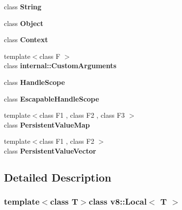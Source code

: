 \begin{DoxyCompactItemize}
\item 
\hypertarget{classv8_1_1Local_a7fb804f7dc96dd9f705c84095f37f1ca}{}class {\bfseries String}\label{classv8_1_1Local_a7fb804f7dc96dd9f705c84095f37f1ca}

\item 
\hypertarget{classv8_1_1Local_a0720b5f434e636e22a3ed34f847eec57}{}class {\bfseries Object}\label{classv8_1_1Local_a0720b5f434e636e22a3ed34f847eec57}

\item 
\hypertarget{classv8_1_1Local_ac26c806e60ca4a0547680edb68f6e39b}{}class {\bfseries Context}\label{classv8_1_1Local_ac26c806e60ca4a0547680edb68f6e39b}

\item 
\hypertarget{classv8_1_1Local_a07108678a2af25caab612879ed7dca62}{}{\footnotesize template$<$class F $>$ }\\class {\bfseries internal\+::\+Custom\+Arguments}\label{classv8_1_1Local_a07108678a2af25caab612879ed7dca62}

\item 
\hypertarget{classv8_1_1Local_a5f127e488db492b05c8542cec0b880b7}{}class {\bfseries Handle\+Scope}\label{classv8_1_1Local_a5f127e488db492b05c8542cec0b880b7}

\item 
\hypertarget{classv8_1_1Local_ade20a528f8ee42d426959f061cff29ff}{}class {\bfseries Escapable\+Handle\+Scope}\label{classv8_1_1Local_ade20a528f8ee42d426959f061cff29ff}

\item 
\hypertarget{classv8_1_1Local_a401e5cd2db49a67497042617f01fdbc2}{}{\footnotesize template$<$class F1 , class F2 , class F3 $>$ }\\class {\bfseries Persistent\+Value\+Map}\label{classv8_1_1Local_a401e5cd2db49a67497042617f01fdbc2}

\item 
\hypertarget{classv8_1_1Local_a978bb1377559897d74d5fe883a54a315}{}{\footnotesize template$<$class F1 , class F2 $>$ }\\class {\bfseries Persistent\+Value\+Vector}\label{classv8_1_1Local_a978bb1377559897d74d5fe883a54a315}

\end{DoxyCompactItemize}


\subsection{Detailed Description}
\subsubsection*{template$<$class T$>$class v8\+::\+Local$<$ T $>$}


